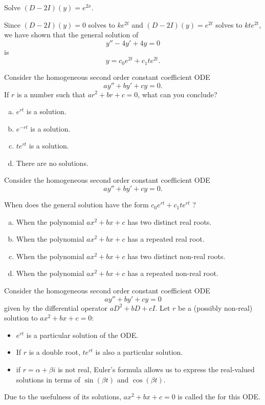 \begin{applicationActivities}
\begin{activity}{15}
Solve \((D-2I)(y)=e^{2x}\).
\end{activity}


\begin{observation}
Since \((D-2I)(y)=0\) solves to \(ke^{2t}\) and \((D-2I)(y)=e^{2t}\) solves to
\(kte^{2t}\), 
we have shown that the general solution of \[y''-4y'+4y=0\] is \[y=c_0e^{2t}+c_1te^{2t}.\]
\end{observation}

\begin{activity}{10}
Consider the homogeneous second order constant coefficient ODE \[ay''+by'+cy=0.\]
If \(r\) is a number such that \(ar^2+br+c=0\), what can you conclude?
\begin{enumerate}[(a)]
\item \(e^{rt}\) is a solution.
\item \(e^{-rt}\) is a solution.
\item \(te^{rt}\) is a solution.
\item There are no solutions.
\end{enumerate}
\end{activity}

\begin{activity}{5}
Consider the homogeneous second order constant coefficient ODE \[ay''+by'+cy=0.\]

When does the general solution have the form \(c_0 e^{rt}+c_1 te^{rt}\) ?
\begin{enumerate}[(a)]
\item When the polynomial \(ax^2+bx+c\) has two distinct real roots.
\item When the polynomial \(ax^2+bx+c\) has a repeated real root.
\item When the polynomial \(ax^2+bx+c\) has two distinct non-real roots.
\item When the polynomial \(ax^2+bx+c\) has a repeated non-real root.
\end{enumerate}
\end{activity}


\begin{observation}
Consider the homogeneous second order constant coefficient ODE \[ay''+by'+cy=0\]
given by the differential operator \(aD^2+bD+cI\).
Let \(r\) be a (possibly non-real) solution to \(ax^2+bx+c=0\):
\vfill
\begin{itemize}
\item \(e^{rt}\) is a particular solution of the ODE.
\item If \(r\) is a double root, \(te^{rt}\) is also a particular solution.
\item if \(r=\alpha+\beta i\) is not real, Euler's formula allows us to express the real-valued solutions in terms of 
  \(\sin(\beta t)\) and \(\cos(\beta t)\).
\end{itemize}
Due to the usefulness of its solutions,
\(ax^2+bx+c=0\) is called the  for this ODE.
\end{observation}



\end{applicationActivities}
